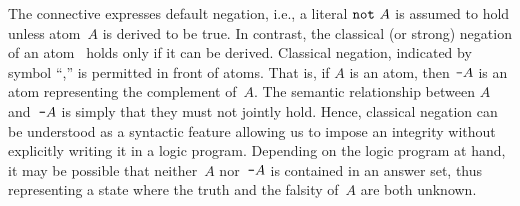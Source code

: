 The connective  expresses default negation,
i.e., a literal $\texttt{not}~A$ is assumed to hold unless atom~$A$ is derived to be true.
In contrast, the classical (or strong) negation of an atom~\cite{gellif91a} %
holds only if %
it can be derived.
Classical negation, indicated by symbol ``\code{-},'' is permitted in front of atoms.
That is, if $A$ is an atom, then $\texttt{-}A$ is 
an atom representing the complement of~$A$.
The semantic relationship between $A$ and~$\texttt{-}A$
is simply that they 
must not jointly hold.
Hence,
classical negation can be understood as a syntactic feature
allowing us to impose an integrity 
without explicitly writing it in a logic program.
Depending on the logic program at hand,
it may be possible that neither~$A$ nor~$\texttt{-}A$ is contained in an answer set,
thus representing a state where the truth and the falsity of~$A$ are both unknown.

